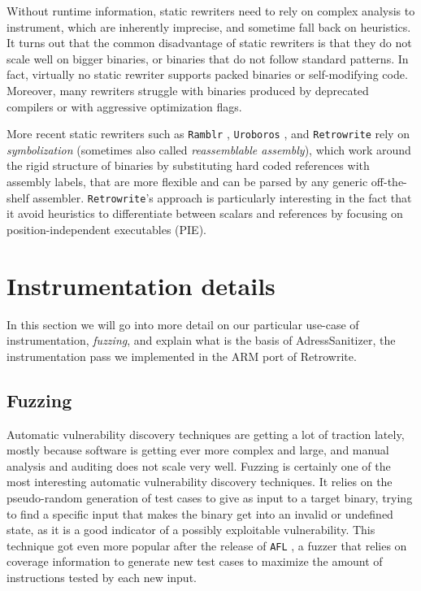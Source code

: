 \documentclass[a4paper,11pt,oneside]{report}
\begin{document}
Without runtime information, static rewriters need to rely on complex analysis 
to instrument, which are inherently imprecise, and sometime fall back on 
heuristics. It turns out that the common disadvantage of static rewriters is 
that they do not scale well on bigger binaries, or binaries that do not follow 
standard patterns. In fact, virtually no static rewriter supports packed 
binaries or self-modifying code. Moreover, many rewriters struggle with 
binaries produced by deprecated compilers or with aggressive optimization 
flags. 

More recent static rewriters such as \texttt{Ramblr} \cite{ramblr}, 
\texttt{Uroboros} \cite{uroboros}, and \texttt{Retrowrite} rely on 
\emph{symbolization} (sometimes also called \emph{reassemblable assembly}), 
which work around the rigid structure of binaries by substituting hard coded 
references with assembly labels, that are more flexible and can be parsed by 
any generic off-the-shelf assembler. \texttt{Retrowrite}'s approach is 
particularly interesting in the fact that it avoid heuristics to differentiate 
between scalars and references by focusing on position-independent executables 
(PIE). 



\section{Instrumentation details}
In this section we will go into more detail on our particular use-case of 
instrumentation, \emph{fuzzing}, and explain what is the basis of 
AdressSanitizer, the instrumentation pass we implemented in the ARM port of 
Retrowrite. 

\subsection{Fuzzing}
Automatic vulnerability discovery techniques are getting a lot of traction 
lately, mostly because software is getting ever more complex and large, and 
manual analysis and auditing does not scale very well. Fuzzing is certainly one 
of the most interesting automatic vulnerability discovery techniques.  It 
relies on the pseudo-random generation of test cases to give as input to a 
target binary, trying to find a specific input that makes the binary get into 
an invalid or undefined state, as it is a good indicator of a possibly 
exploitable vulnerability. This technique got even more popular after the 
release of \texttt{AFL} \cite{afl}, a fuzzer that relies on coverage  
information to generate new test cases to maximize the amount of instructions 
tested by each new input. 
\end{document}
